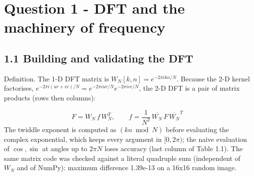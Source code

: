 \documentclass[10pt,a4paper]{article}
\begin{document}
\section{Question 1 - DFT and the machinery of frequency}
\subsection{1.1 Building and validating the DFT}
Definition. The 1-D DFT matrix is $W_N[k,n]=e^{-2\pi i kn/N}$. Because the 2-D kernel factorises, $e^{-2\pi i(ur+vc)/N}=e^{-2\pi i ur/N}e^{-2\pi i vc/N}$, the 2-D DFT is a pair of matrix products (rows then columns):

\begin{equation}F = W_N\, f\, W_N^{T}, \qquad f = \frac{1}{N^{2}}\,\overline{W_N}\, F\, \overline{W_N}^{T}\end{equation}
The twiddle exponent is computed as $(kn \bmod N)$ before evaluating the complex exponential, which keeps every argument in $[0,2\pi)$; the naive evaluation of $\cos,\sin$ at angles up to $2\pi N$ loses accuracy (last column of Table 1.1). The same matrix code was checked against a literal quadruple sum (independent of $W_N$ and of NumPy): maximum difference 1.39e-13 on a 16x16 random image.
\end{document}
